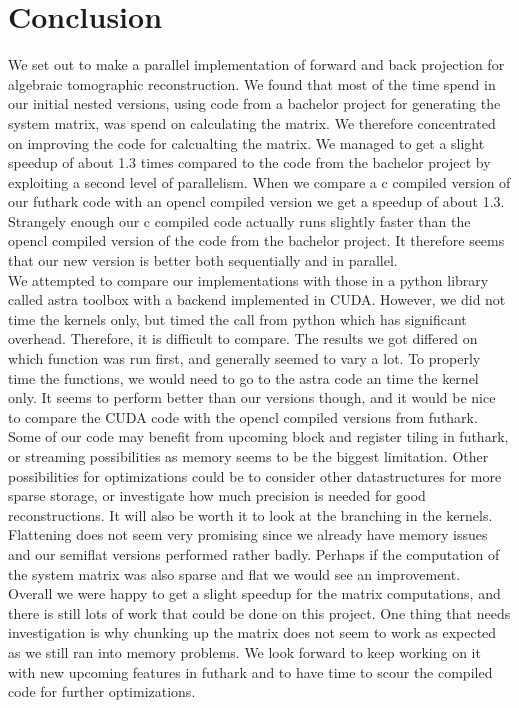 \section{Conclusion}
We set out to make a parallel implementation of forward and back projection for algebraic tomographic reconstruction. We found that most of the time spend in our initial nested versions, using code from a bachelor project for generating the system matrix, was spend on calculating the matrix. We therefore concentrated on improving the code for calcualting the matrix. We managed to get a slight speedup of about 1.3 times compared to the code from the bachelor project by exploiting a second level of parallelism. When we compare a c compiled version of our futhark code with an opencl compiled version we get a speedup of about 1.3. Strangely enough our c compiled code actually runs slightly faster than the opencl compiled version of the code from the bachelor project. It therefore seems that our new version is better both sequentially and in parallel.\\
We attempted to compare our implementations with those in a python library called astra toolbox with a backend implemented in CUDA. However, we did not time the kernels only, but timed the call from python which has significant overhead. Therefore, it is difficult to compare. The results we got differed on which function was run first, and generally seemed to vary a lot. To properly time the functions, we would need to go to the astra code an time the kernel only. It seems to perform better than our versions though, and it would be nice to compare the CUDA code with the opencl compiled versions from futhark.\\
Some of our code may benefit from upcoming block and register tiling in futhark, or streaming possibilities as memory seems to be the biggest limitation. Other possibilities for optimizations could be to consider other datastructures for more sparse storage, or investigate how much precision is needed for good reconstructions. It will also be worth it to look at the branching in the kernels. Flattening does not seem very promising since we already have memory issues and our semiflat versions performed rather badly. Perhaps if the computation of the system matrix was also sparse and flat we would see an improvement. \\
Overall we were happy to get a slight speedup for the matrix computations, and there is still lots of work that could be done on this project. One thing that needs investigation is why chunking up the matrix does not seem to work as expected as we still ran into memory problems. We look forward to keep working on it with new upcoming features in futhark and to have time to scour the compiled code for further optimizations.\\

